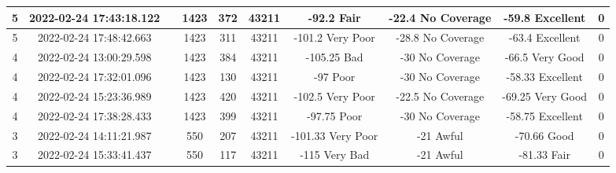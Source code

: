 \begin{longtable*}{|c|c|c|c|c|c|c|c|c|c|}
5&2022-02-24 17:43:18.122&&1423&372&43211& -92.2     Fair        & -22.4     No Coverage & -59.8     Excellent   & 0\\\hline
{}5&2022-02-24 17:48:42.663&&1423&311&43211& -101.2    Very Poor   & -28.8     No Coverage & -63.4     Excellent   & 0\\\hline
{}4&2022-02-24 13:00:29.598&&1423&384&43211& -105.25   Bad         & -30       No Coverage & -66.5     Very Good   & 0\\\hline
{}4&2022-02-24 17:32:01.096&&1423&130&43211& -97       Poor        & -30       No Coverage & -58.33    Excellent   & 0\\\hline
{}4&2022-02-24 15:23:36.989&&1423&420&43211& -102.5    Very Poor   & -22.5     No Coverage & -69.25    Very Good   & 0\\\hline
{}4&2022-02-24 17:38:28.433&&1423&399&43211& -97.75    Poor        & -30       No Coverage & -58.75    Excellent   & 0\\\hline
{}3&2022-02-24 14:11:21.987&&550&207&43211& -101.33   Very Poor   & -21       Awful       & -70.66    Good        & 0\\\hline
{}3&2022-02-24 15:33:41.437&&550&117&43211& -115      Very Bad    & -21       Awful       & -81.33    Fair        & 0\\\hline

\end{longtable*}
